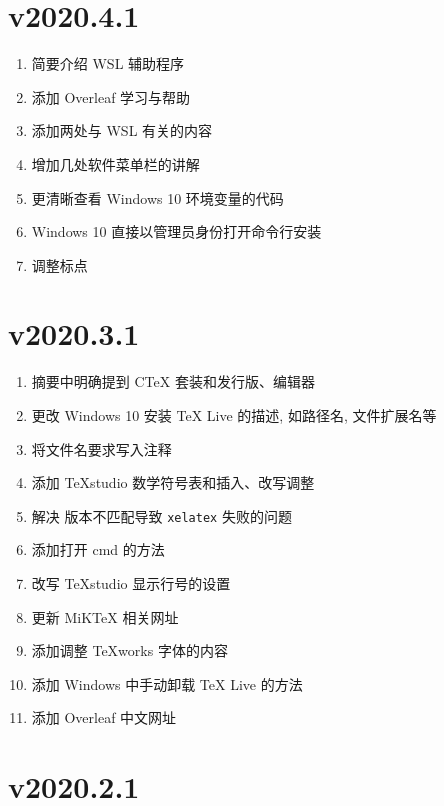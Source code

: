 \section*{v2020.4.1}

\begin{enumerate}
  \item 简要介绍 WSL 辅助程序
  \item 添加 Overleaf 学习与帮助
  \item 添加两处与 WSL 有关的内容
  \item 增加几处软件菜单栏的讲解
  \item 更清晰查看 Windows 10 环境变量的代码
  \item Windows 10 直接以管理员身份打开命令行安装
  \item 调整标点
\end{enumerate}

\section*{v2020.3.1}

\begin{enumerate}
    \item 摘要中明确提到 C\TeX{} 套装和发行版、编辑器
    \item 更改 Windows 10 安装 \TeX{} Live 的描述, 如路径名, 文件扩展名等
    \item 将文件名要求写入注释
    \item 添加 \TeX studio 数学符号表和插入、改写调整
    \item 解决 \LaTeXe 版本不匹配导致 \texttt{xelatex} 失败的问题
    \item 添加打开 \textsf{cmd} 的方法
    \item 改写 \TeX studio 显示行号的设置
    \item 更新 MiK\TeX{} 相关网址
    \item 添加调整 \TeX works 字体的内容
    \item 添加 Windows 中手动卸载 \TeX{} Live 的方法
    \item 添加 Overleaf 中文网址
\end{enumerate}

\section*{v2020.2.1}

